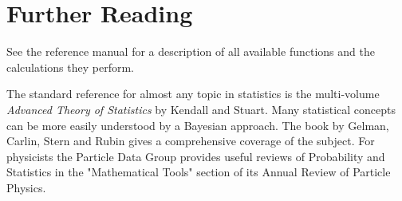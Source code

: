 \section{Further Reading}
\label{sec:stat:further-reading}

See the \gsl{} reference manual for a description of all available functions
and the calculations they perform.

The standard reference for almost any topic in statistics is the multi-volume
\emph{Advanced Theory of Statistics} by Kendall and Stuart.  Many statistical
concepts can be more easily understood by a Bayesian approach.  The book by
Gelman, Carlin, Stern and Rubin gives a comprehensive coverage of the subject.
For physicists the Particle Data Group provides useful reviews of Probability
and Statistics in the "Mathematical Tools" section of its Annual Review of
Particle Physics.
   
\begin{seealso}
   
   
   
\end{seealso}


